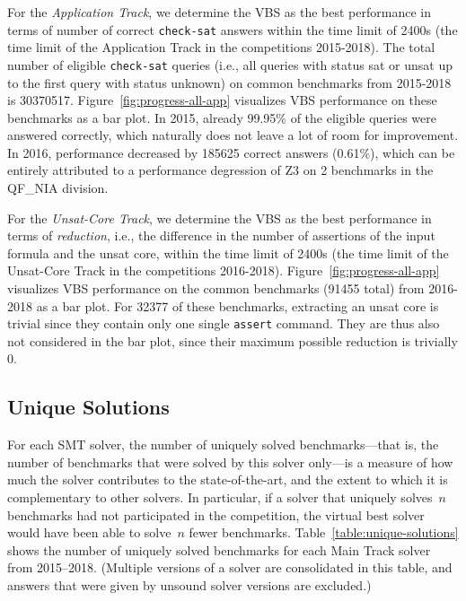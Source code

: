 \documentclass[dvipsnames,table,twoside,11pt]{article}
\newcommand{\maintrack}{Main Track\xspace}
\newcommand{\apptrack}{Application Track\xspace}
\newcommand{\ucoretrack}{Unsat-Core Track\xspace}
\begin{document}
For the \emph{\apptrack}, we determine the VBS as the best performance
in terms of number of correct \texttt{check-sat} answers within the time limit
of 2400s (the time limit of the \apptrack in the competitions
2015-2018).
The total number of eligible \texttt{check-sat} queries (i.e., all queries with
status sat or unsat up to the first query with status unknown) on
common benchmarks from 2015-2018 is 30370517.
Figure~\ref{fig:progress-all-app} visualizes VBS performance on these
benchmarks as a bar plot.
In 2015, already 99.95\% of the eligible queries were answered correctly,
which naturally does not leave a lot of room for improvement.
In 2016, performance decreased by 185625 correct answers (0.61\%),
which can be entirely attributed to a performance degression
of Z3 on 2 benchmarks in the QF\_NIA division.

For the \emph{\ucoretrack}, we determine the VBS as the best performance in
terms of \emph{reduction}, i.e., the difference in the number of assertions
of the input formula and the unsat core, within the time limit
of 2400s (the time limit of the \ucoretrack in the competitions
2016-2018).
Figure~\ref{fig:progress-all-app} visualizes VBS performance on the common
benchmarks (91455 total) from 2016-2018 as a bar plot.
For 32377 of these benchmarks, extracting an unsat core is trivial since
they contain only one single \texttt{assert} command.
They are thus also not considered in the bar plot, since their maximum
possible reduction is trivially 0.


\subsection{Unique Solutions}

For each SMT solver, the number of uniquely solved benchmarks---that
is, the number of benchmarks that were solved by this solver only---is
a measure of how much the solver contributes to the state-of-the-art,
and the extent to which it is complementary to other solvers.  In
particular, if a solver that uniquely solves~$n$ benchmarks had not
participated in the competition, the virtual best solver would have
been able to solve~$n$ fewer benchmarks.
Table~\ref{table:unique-solutions} shows the number of uniquely solved
benchmarks for each \maintrack solver from 2015--2018.  (Multiple
versions of a solver are consolidated in this table, and answers that
were given by unsound solver versions are excluded.)
\end{document}
